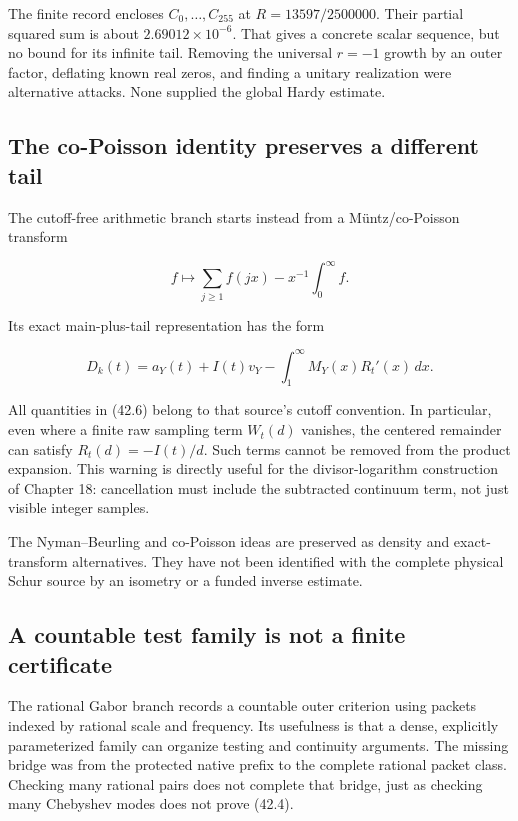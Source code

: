 \documentclass[
  10pt,
  a4paper,
  10pt,
  oneside,
  openany]{book}
\begin{document}
The finite record encloses \(C_0,\ldots,C_{255}\) at
\(R=13597/2500000\). Their partial squared sum is about
\(2.69012\times10^{-6}\). That gives a concrete scalar sequence, but no
bound for its infinite tail. Removing the universal \(r=-1\) growth by
an outer factor, deflating known real zeros, and finding a unitary
realization were alternative attacks. None supplied the global Hardy
estimate.

\subsection{The co-Poisson identity preserves a different
tail}\label{the-co-poisson-identity-preserves-a-different-tail}

The cutoff-free arithmetic branch starts instead from a Müntz/co-Poisson
transform

\[
 f\longmapsto\sum_{j\ge1}f(jx)-x^{-1}\int_0^\infty f.
\]

Its exact main-plus-tail representation has the form

\[
 D_k(t)=a_Y(t)+I(t)v_Y-
 \int_1^\infty M_Y(x)R_t'(x)\,dx.
 \tag{42.6}\label{eq:42.6}
\]

All quantities in (42.6) belong to that source's cutoff convention. In
particular, even where a finite raw sampling term \(W_t(d)\) vanishes,
the centered remainder can satisfy \(R_t(d)=-I(t)/d\). Such terms cannot
be removed from the product expansion. This warning is directly useful
for the divisor-logarithm construction of Chapter 18: cancellation must
include the subtracted continuum term, not just visible integer samples.

The Nyman--Beurling and co-Poisson ideas are preserved as density and
exact-transform alternatives. They have not been identified with the
complete physical Schur source by an isometry or a funded inverse
estimate.

\subsection{A countable test family is not a finite
certificate}\label{a-countable-test-family-is-not-a-finite-certificate}

The rational Gabor branch records a countable outer criterion using
packets indexed by rational scale and frequency. Its usefulness is that
a dense, explicitly parameterized family can organize testing and
continuity arguments. The missing bridge was from the protected native
prefix to the complete rational packet class. Checking many rational
pairs does not complete that bridge, just as checking many Chebyshev
modes does not prove (42.4).
\end{document}
